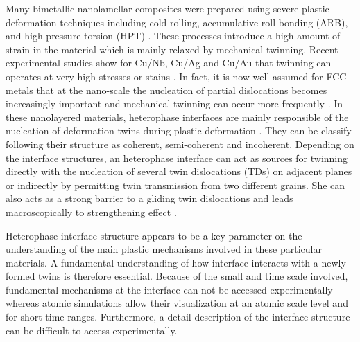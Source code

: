 \documentclass[final,3p,times,twocolumn]{elsarticle}
\begin{document}
Many bimetallic nanolamellar composites were prepared using severe plastic deformation techniques including cold rolling, accumulative roll-bonding (ARB), and high-pressure torsion (HPT) \cite{tian13SM,han12APL}. These processes introduce a high amount of strain in the material which is mainly relaxed by mechanical twinning. Recent experimental studies show for Cu/Nb, Cu/Ag and Cu/Au that twinning can operates at very high stresses or stains \cite{zheng14AM}. In fact, it is now well assumed for FCC metals that at the nano-scale the nucleation of partial dislocations becomes increasingly important and mechanical twinning can occur more frequently \cite{chen03S,dehm07AM}. In these nanolayered materials, heterophase interfaces are mainly responsible of the nucleation of deformation twins during plastic deformation \cite{li14PML,li15PM2}. They can be classify following their structure as coherent, semi-coherent and incoherent. Depending on the interface structures, an heterophase interface can act as sources for twinning directly with the nucleation of several twin dislocations (TDs) on adjacent planes or indirectly by permitting twin transmission from two different grains. She can also acts as a strong barrier to a gliding twin dislocations and leads macroscopically to strengthening effect \citep{an15APL}.   

Heterophase interface structure appears to be a key parameter on the understanding of the main plastic mechanisms involved in these particular materials. A fundamental understanding of how interface interacts with a newly formed twins is therefore essential. Because of the small and time scale involved, fundamental mechanisms at the interface can not be accessed experimentally whereas atomic simulations allow their visualization at an atomic scale level and for short time ranges. Furthermore, a detail description of the interface structure can be difficult to access experimentally.   
\end{document}
